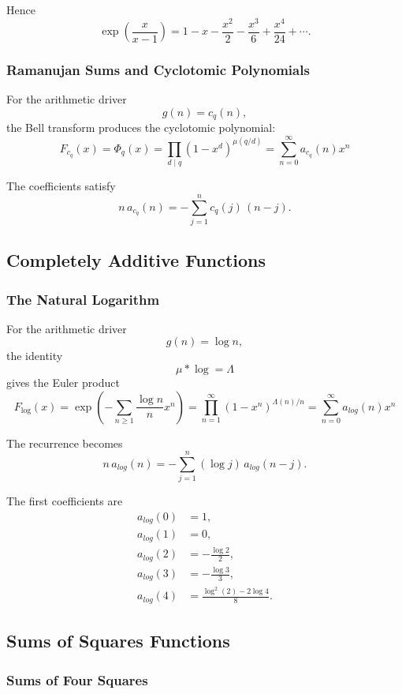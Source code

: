 \documentclass[11pt, a4paper]{article}
\theoremstyle{remark}
\begin{document}
Hence
\[
\exp\!\left(
\frac{x}{x-1}
\right)
=
1-x-\frac{x^2}{2}
-\frac{x^3}{6}
+\frac{x^4}{24}
+\cdots.
\]

\subsubsection{Ramanujan Sums and Cyclotomic Polynomials}

For the arithmetic driver
\[
g(n)=c_q(n),
\]
the Bell transform produces the cyclotomic polynomial:
\[
F_{c_q}(x)
=
\Phi_q(x)
=
\prod_{d\mid q}
(1-x^d)^{\mu(q/d)}=\sum_{n=0}^{\infty}a_{c_q}(n)x^n
\]

The coefficients satisfy
\[
\boxed{
n\,a_{c_q}(n)
=
-\sum_{j=1}^n
c_q(j)\,(n-j).
}
\]




\subsection{Completely Additive Functions}

\subsubsection{The Natural Logarithm}

For the arithmetic driver
\[
g(n)=\log n,
\]
the identity
\[
\mu*\log=\Lambda
\]
gives the Euler product
\[
F_{\log}(x)
=
\exp\!\left(
-\sum_{n\ge1}\frac{\log n}{n}x^n
\right)
=
\prod_{n=1}^{\infty}
(1-x^n)^{\Lambda(n)/n}=\sum_{n=0}^{\infty}a_{log}(n)x^n
\]

The recurrence becomes
\[
\boxed{
n\,a_{log}(n)
=
-\sum_{j=1}^n
(\log j)\,a_{log}(n-j).
}
\]

The first coefficients are
\[
\begin{aligned}
a_{log}(0)&=1,\\
a_{log}(1)&=0,\\
a_{log}(2)&=-\frac{\log2}{2},\\
a_{log}(3)&=-\frac{\log3}{3},\\
a_{log}(4)&=
\frac{\log^2(2)-2\log4}{8}.
\end{aligned}
\]

\subsection{Sums of Squares Functions}

\subsubsection{Sums of Four Squares}
\end{document}
